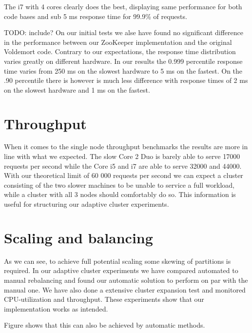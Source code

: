 The i7 with 4 cores clearly does the best, displaying same performance for both code bases and sub 5 ms response time for 99.9\% of requests.

TODO: include?
On our initial tests we alse have found no significant difference in the performance between our ZooKeeper implementation and the original Voldemort code. Contrary to our expectations, the response time distribution varies greatly on different hardware. In our results the 0.999 percentile response time varies from 250 ms on the slowest hardware to 5 ms on the fastest. On the .90 percentile there is however is much less difference with response times of 2 ms on the slowest hardware and 1 ms on the fastest.

\section{Throughput}
\label{eval:throughput}
When it comes to the single node throughput benchmarks the results are more in line with what we expected. The slow Core 2 Duo is barely able to serve 17000 requests per second while the Core i5 and i7 are able to serve 32000 and 44000. With our theoretical limit of 60 000 requests per second we can expect a cluster consisting of the two slower machines to be unable to service a full workload, while a cluster with all 3 nodes should comfortably do so. This information is useful for structuring our adaptive cluster experiments.

\section{Scaling and balancing}
\label{eval:balance}
As we can see, to achieve full potential scaling some skewing of partitions is required. In our adaptive cluster experiments we have compared automated to manual rebalancing and found our automatic solution to perform on par with the manual one. We have also done a extensive cluster expansion test and monitored CPU-utilization and throughput. These experiments show that our implementation works as intended.

Figure shows that this can also be achieved by automatic methods.

